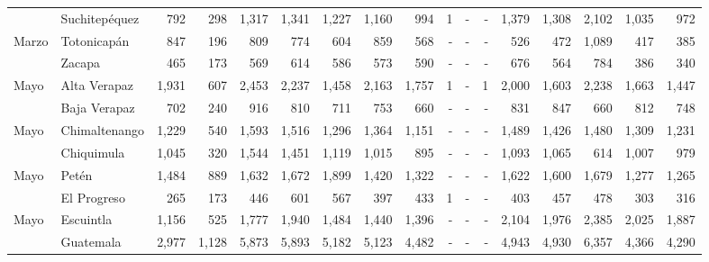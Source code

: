 \begin{landscape}
\begin{center}
\begin{longtable}{llrrrrrrrrrrrrrrr}
			\rowcolor{color1!5!white}\multicolumn{1}{l}{	\footnotesize	 Marzo 	}&	 Suchitepéquez 	&	 792 	&	 298 	&	 1,317 	&	 1,341 	&	 1,227 	&	 1,160 	&	 994 	&	 1 	&	 -   	&	 -   	&	 1,379 	&	 1,308 	&	 2,102 	&	 1,035 	&	 972 	\\
			\multicolumn{1}{l}{	\footnotesize	 Marzo 	}&	 Totonicapán 	&	 847 	&	 196 	&	 809 	&	 774 	&	 604 	&	 859 	&	 568 	&	 -   	&	 -   	&	 -   	&	 526 	&	 472 	&	 1,089 	&	 417 	&	 385 	\\
			\rowcolor{color1!5!white}\multicolumn{1}{l}{	\footnotesize	 Marzo 	}&	 Zacapa 	&	 465 	&	 173 	&	 569 	&	 614 	&	 586 	&	 573 	&	 590 	&	 -   	&	 -   	&	 -   	&	 676 	&	 564 	&	 784 	&	 386 	&	 340 	\\
			\multicolumn{1}{l}{	\footnotesize	 Mayo 	}&	 Alta Verapaz 	&	 1,931 	&	 607 	&	 2,453 	&	 2,237 	&	 1,458 	&	 2,163 	&	 1,757 	&	 1 	&	 -   	&	 1 	&	 2,000 	&	 1,603 	&	 2,238 	&	 1,663 	&	 1,447 	\\
			\rowcolor{color1!5!white}\multicolumn{1}{l}{	\footnotesize	 Mayo 	}&	 Baja Verapaz 	&	 702 	&	 240 	&	 916 	&	 810 	&	 711 	&	 753 	&	 660 	&	 -   	&	 -   	&	 -   	&	 831 	&	 847 	&	 660 	&	 812 	&	 748 	\\
			\multicolumn{1}{l}{	\footnotesize	 Mayo 	}&	 Chimaltenango 	&	 1,229 	&	 540 	&	 1,593 	&	 1,516 	&	 1,296 	&	 1,364 	&	 1,151 	&	 -   	&	 -   	&	 -   	&	 1,489 	&	 1,426 	&	 1,480 	&	 1,309 	&	 1,231 	\\
			\rowcolor{color1!5!white}\multicolumn{1}{l}{	\footnotesize	 Mayo 	}&	 Chiquimula 	&	 1,045 	&	 320 	&	 1,544 	&	 1,451 	&	 1,119 	&	 1,015 	&	 895 	&	 -   	&	 -   	&	 -   	&	 1,093 	&	 1,065 	&	 614 	&	 1,007 	&	 979 	\\
			\multicolumn{1}{l}{	\footnotesize	 Mayo 	}&	 Petén 	&	 1,484 	&	 889 	&	 1,632 	&	 1,672 	&	 1,899 	&	 1,420 	&	 1,322 	&	 -   	&	 -   	&	 -   	&	 1,622 	&	 1,600 	&	 1,679 	&	 1,277 	&	 1,265 	\\
			\rowcolor{color1!5!white}\multicolumn{1}{l}{	\footnotesize	 Mayo 	}&	 El Progreso 	&	 265 	&	 173 	&	 446 	&	 601 	&	 567 	&	 397 	&	 433 	&	 1 	&	 -   	&	 -   	&	 403 	&	 457 	&	 478 	&	 303 	&	 316 	\\
			\multicolumn{1}{l}{	\footnotesize	 Mayo 	}&	 Escuintla 	&	 1,156 	&	 525 	&	 1,777 	&	 1,940 	&	 1,484 	&	 1,440 	&	 1,396 	&	 -   	&	 -   	&	 -   	&	 2,104 	&	 1,976 	&	 2,385 	&	 2,025 	&	 1,887 	\\
			\rowcolor{color1!5!white}\multicolumn{1}{l}{	\footnotesize	 Mayo 	}&	 Guatemala 	&	 2,977 	&	 1,128 	&	 5,873 	&	 5,893 	&	 5,182 	&	 5,123 	&	 4,482 	&	 -   	&	 -   	&	 -   	&	 4,943 	&	 4,930 	&	 6,357 	&	 4,366 	&	 4,290 	\\

\end{longtable}
\end{center}
\end{landscape}
